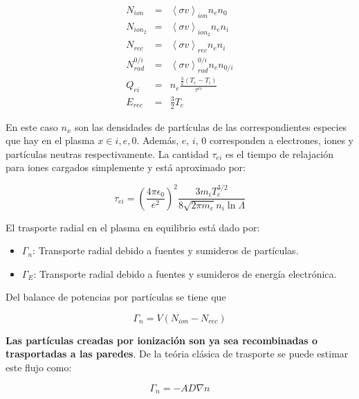 \documentclass[11pt]{article}
\theoremstyle{definition}
\begin{document}
  \begin{eqnarray}
    N_{ion} &=& \left<\sigma v\right>_{ion}n_en_0\\
    N_{ion_2} &=& \left<\sigma v\right>_{ion_2}n_en_i\\
    N_{rec} &=& \left<\sigma v\right>_{rec}n_en_i\\
    N_{rad}^{0/i} &=& \left<\sigma v\right>_{rad}^{0/i}n_en_{0/i}\\
    Q_{ei} &=& n_e\frac{\frac{3}{2}(T_e - T_i)}{\tau^{ei}} \label{eq:Qei} \\
    E_{rec} &=& \frac{3}{2}T_e
  \end{eqnarray}

  En este caso $n_x$ son las densidades de part\'iculas de las correspondientes especies que hay en el plasma $x \in {i,e,0}$. Adem\'as, $e$, $i$, $0$ corresponden a electrones, iones y part\'iculas neutras respectivamente. La cantidad $\tau_{ei}$ es el tiempo de relajaci\'on para iones cargados simplemente y est\'a aproximado por:

  \begin{equation}\label{eq:tau}
    \tau_{ei} = \left(\frac{4\pi\epsilon_0}{e^2}\right)^2\frac{3m_iT_e^{3/2}}{8\sqrt{2\pi m_e}n_i\ln{\Lambda}}
  \end{equation}

  El trasporte radial en el plasma en equilibrio est\'a dado por:

  \begin{itemize}
    \item $\Gamma_n$: Transporte radial debido a fuentes y sumideros de part\'iculas.
    \item $\Gamma_E$: Transporte radial debido a fuentes y sumideros de energ\'ia electr\'onica.
  \end{itemize}

  Del balance de potencias por part\'iculas se tiene que

  \begin{equation}\label{eq:7}
    \Gamma_n = V(N_{ion} - N_{rec})
  \end{equation}

  \textbf{Las part\'iculas creadas por ionizaci\'on son ya sea recombinadas o trasportadas a las paredes}. De la te\'oria cl\'asica de trasporte se puede estimar este flujo como:

  \begin{equation}\label{eq:Gamma_n}
    \Gamma_n = -AD\nabla n
  \end{equation}
\end{document}

